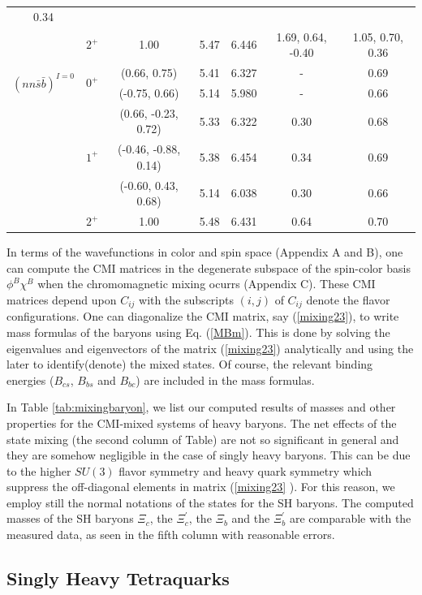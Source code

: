 \documentclass[prd,twocolumn,floatfix,nofootinbib]{revtex4}
\begin{document}
\begin{table}[!htb]
\begin{tabular}{ccccccc}
0.34 \\
& $2^{+}$ & 1.00 & 5.47 & 6.446 & 1.69, 0.64, -0.40 & 1.05, 0.70, 0.36 \\
\multirow{2}{*}{${(nn\bar{s}\bar{b})}^{I=0}$} & \multirow{2}{*}{$0^{+}$} &
(0.66, 0.75) & 5.41 & 6.327 & - & 0.69 \\
&  & (-0.75, 0.66) & 5.14 & 5.980 & - & 0.66 \\
& \multirow{3}{*}{$1^{+}$} & (0.66, -0.23, 0.72) & 5.33 & 6.322 & 0.30 & 0.68
\\
&  & (-0.46, -0.88, 0.14) & 5.38 & 6.454 & 0.34 & 0.69 \\
&  & (-0.60, 0.43, 0.68) & 5.14 & 6.038 & 0.30 & 0.66 \\
& $2^{+}$ & 1.00 & 5.48 & 6.431 & 0.64 & 0.70 \\ \hline\hline
\end{tabular}%
\end{table}

In terms of the wavefunctions in color and spin space (Appendix A and B),
one can compute the CMI matrices in the degenerate subspace of the
spin-color basis $\phi ^{B}\chi ^{B}$ when the chromomagnetic mixing ocurrs
(Appendix C). These CMI matrices depend upon $C_{ij}$ with the subscripts $%
(i,j)$ of $C_{ij}$ denote the flavor configurations. One can diagonalize the
CMI matrix, say (\ref{mixing23}), to write mass formulas of the baryons
using Eq. (\ref{MBm}). This is done by solving the eigenvalues and
eigenvectors of the matrix (\ref{mixing23}) analytically and using the later
to identify(denote) the mixed states. Of course, the relevant binding
energies ($B_{cs}$, $B_{bs}$ and $B_{bc}$) are included in the mass formulas.

In Table \ref{tab:mixingbaryon}, we list our computed results of masses and
other properties for the CMI-mixed systems of heavy baryons. The net effects
of the state mixing (the second column of Table) are not so significant in
general and they are somehow negligible in the case of singly heavy baryons.
This can be due to the higher $SU(3)$ flavor symmetry and heavy quark
symmetry which suppress the off-diagonal elements in matrix (\ref{mixing23}%
). For this reason, we employ still the normal notations of the states for
the SH baryons. The computed masses of the SH baryons $\Xi _{c}$, the $\Xi
_{c}^{\prime }$, the $\Xi _{b}$ and the $\Xi _{b}^{\prime }$ are comparable
with the measured data, as seen in the fifth column with reasonable errors.

\subsection{Singly Heavy Tetraquarks}
\end{document}
